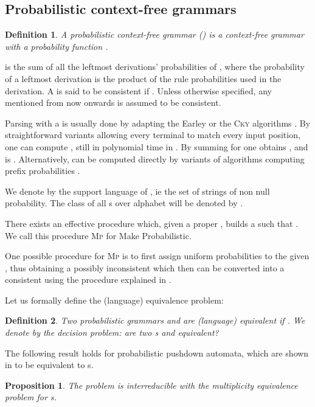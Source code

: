 \documentclass[submission]{eptcs} \usepackage{breakurl}             \usepackage[english]{babel}
\newtheorem{definition}{Definition}
\newtheorem{proposition}{Proposition}
\begin{document}
\subsection{Probabilistic context-free grammars}

\begin{definition}
  A \emph{probabilistic context-free grammar ()} 
  is a context-free grammar   with a probability function 
  .
\end{definition}


 is the sum of all the leftmost derivations’ probabilities of , where the probability of a leftmost derivation is the product of the rule probabilities used in the derivation. A   is said to be consistent if . Unless otherwise specified, any  mentioned from now onwards is assumed to be consistent. 

Parsing with a  is usually done by adapting the Earley or the
\textsc{Cky} algorithms \cite{jelinek92}. By straightforward variants allowing every terminal to match every input position, one can compute , still in polynomial time in . By summing  for  one obtains 
, and  is . Alternatively,  can be computed directly by variants of algorithms computing prefix probabilities \cite{jelinek91,stol95}.

We denote by  the support language of , ie the set of strings of non null probability.
The class of all s over alphabet  will be denoted by .

There exists an effective procedure which, given a proper  , builds a   such that . We call this procedure \textsc{Mp} for Make Probabilistic.

One possible procedure for \textsc{Mp} is to first assign uniform probabilities to the given , thus obtaining a possibly inconsistent  which then can be converted into a consistent  using the procedure explained in \cite{gecs10}.

Let us formally define the (language) equivalence problem:
\begin{definition}
Two probabilistic grammars  and  are \emph{(language) equivalent} if .
We denote by  the decision problem: are two s  and  equivalent?
\end{definition}
The following result holds for  probabilistic pushdown automata, which are shown in \cite{abne99} to be equivalent to s.
\begin{proposition}\cite{fore14}
The  problem is interreducible with the multiplicity equivalence problem for s.
\end{proposition}
\end{document}
